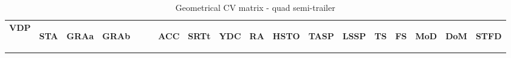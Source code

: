 
\begin{table}[H]
\centering\scriptsize
\caption{Geometrical CV matrix - quad semi-trailer}   
\label{table:cv-geometrical-quad-semi}%
\begin{tabular}{|l|c|c|c|c|c|c|c|c|c|c|c|c|c|c|c|}

\hline
\multicolumn{1}{|c|}{\textbf{VDP}} & \begin{sideways}\textbf{STA}\end{sideways} & \begin{sideways}\textbf{GRAa}\end{sideways} & \begin{sideways}\textbf{GRAb~~~~}\end{sideways} & \begin{sideways}\textbf{ACC}\end{sideways} & \begin{sideways}\textbf{SRTt}\end{sideways} & \begin{sideways}\textbf{YDC}\end{sideways} & \begin{sideways}\textbf{RA}\end{sideways} & \begin{sideways}\textbf{HSTO}\end{sideways} & \begin{sideways}\textbf{TASP}\end{sideways} & \begin{sideways}\textbf{LSSP}\end{sideways} & \begin{sideways}\textbf{TS}\end{sideways} & \begin{sideways}\textbf{FS}\end{sideways} & \begin{sideways}\textbf{MoD}\end{sideways} & \begin{sideways}\textbf{DoM}\end{sideways} & \begin{sideways}\textbf{STFD}\end{sideways} \bigstrut\\


\end{tabular}
\end{table}

